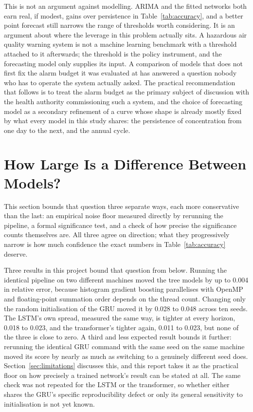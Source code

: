 \documentclass[12pt,a4paper]{report}
\begin{document}
This is not an argument against modelling. ARIMA and the fitted networks
both earn real, if modest, gains over persistence in Table~\ref{tab:accuracy},
and a better point forecast still narrows the range of thresholds worth
considering. It is an argument about where the leverage in this problem
actually sits. A hazardous air quality warning system is not a machine
learning benchmark with a threshold attached to it afterwards; the threshold
is the policy instrument, and the forecasting model only supplies its input.
A comparison of models that does not first fix the alarm budget it was
evaluated at has answered a question nobody who has to operate the system
actually asked. The practical recommendation that follows is to treat the
alarm budget as the primary subject of discussion with the health authority
commissioning such a system, and the choice of forecasting model as a
secondary refinement of a curve whose shape is already mostly fixed by what
every model in this study shares: the persistence of concentration from one
day to the next, and the annual cycle.

\section{How Large Is a Difference Between Models?}
\label{sec:noise-floor}

This section bounds that question three separate ways, each more
conservative than the last: an empirical noise floor measured directly by
rerunning the pipeline, a formal significance test, and a check of how
precise the significance counts themselves are. All three agree on
direction; what they progressively narrow is how much confidence the
exact numbers in Table~\ref{tab:accuracy} deserve.

Three results in this project bound that question from below. Running the
identical pipeline on two different machines moved the tree models by up to
0.004 in relative error, because histogram gradient boosting parallelises
with OpenMP and floating-point summation order depends on the thread count.
Changing only the random initialisation of the GRU moved it by 0.028 to
0.048 across ten seeds. The LSTM's own spread, measured the same way, is
tighter at every horizon, 0.018 to 0.023, and the transformer's tighter
again, 0.011 to 0.023, but none of the three is close to zero. A third and
less expected result bounds it further: rerunning the identical GRU command
with the same seed on the same machine moved its score by nearly as much as
switching to a genuinely different seed does. Section~\ref{sec:limitations}
discusses this, and this report takes it as the practical floor on how
precisely a trained network's result can be stated at all. The same check
was not repeated for the LSTM or the transformer, so whether either shares
the GRU's specific reproducibility defect or only its general sensitivity to
initialisation is not yet known.
\end{document}
